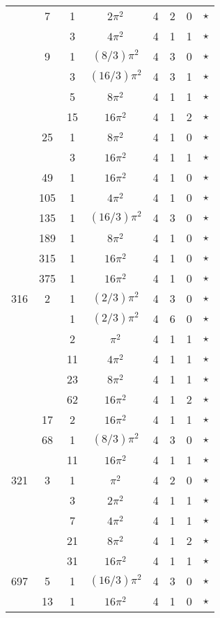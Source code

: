 \documentclass[12pt]{amsart}
\begin{document}
\begin{tabular}{ccc|ccccc}
 & 7 & 1 & $2\pi^2$ & 4 & 2 & 0 & $\star$ \\
 &  & 3 & $4\pi^2$ & 4 & 1 & 1 & $\star$ \\
 & 9 & 1 & $(8/3)\pi^2$ & 4 & 3 & 0 & $\star$ \\
 &  & 3 & $(16/3)\pi^2$ & 4 & 3 & 1 & $\star$ \\
 &  & 5 & $8\pi^2$ & 4 & 1 & 1 & $\star$ \\
 &  & 15 & $16\pi^2$ & 4 & 1 & 2 & $\star$ \\
 & 25 & 1 & $8\pi^2$ & 4 & 1 & 0 & $\star$ \\
 &  & 3 & $16\pi^2$ & 4 & 1 & 1 & $\star$ \\
 & 49 & 1 & $16\pi^2$ & 4 & 1 & 0 & $\star$ \\
 & 105 & 1 & $4\pi^2$ & 4 & 1 & 0 & $\star$ \\
 & 135 & 1 & $(16/3)\pi^2$ & 4 & 3 & 0 & $\star$ \\
 & 189 & 1 & $8\pi^2$ & 4 & 1 & 0 & $\star$ \\
 & 315 & 1 & $16\pi^2$ & 4 & 1 & 0 & $\star$ \\
 & 375 & 1 & $16\pi^2$ & 4 & 1 & 0 & $\star$ \\
316 & 2 & 1 & $(2/3)\pi^2$ & 4 & 3 & 0 & $\star$ \\
 &  & 1 & $(2/3)\pi^2$ & 4 & 6 & 0 & $\star$ \\
 &  & 2 & $\pi^2$ & 4 & 1 & 1 & $\star$ \\
 &  & 11 & $4\pi^2$ & 4 & 1 & 1 & $\star$ \\
 &  & 23 & $8\pi^2$ & 4 & 1 & 1 & $\star$ \\
 &  & 62 & $16\pi^2$ & 4 & 1 & 2 & $\star$ \\
 & 17 & 2 & $16\pi^2$ & 4 & 1 & 1 & $\star$ \\
 & 68 & 1 & $(8/3)\pi^2$ & 4 & 3 & 0 & $\star$ \\
 &  & 11 & $16\pi^2$ & 4 & 1 & 1 & $\star$ \\
321 & 3 & 1 & $\pi^2$ & 4 & 2 & 0 & $\star$ \\
 &  & 3 & $2\pi^2$ & 4 & 1 & 1 & $\star$ \\
 &  & 7 & $4\pi^2$ & 4 & 1 & 1 & $\star$ \\
 &  & 21 & $8\pi^2$ & 4 & 1 & 2 & $\star$ \\
 &  & 31 & $16\pi^2$ & 4 & 1 & 1 & $\star$ \\
697 & 5 & 1 & $(16/3)\pi^2$ & 4 & 3 & 0 & $\star$ \\
 & 13 & 1 & $16\pi^2$ & 4 & 1 & 0 & $\star$ \\

\end{tabular}
\end{document}
